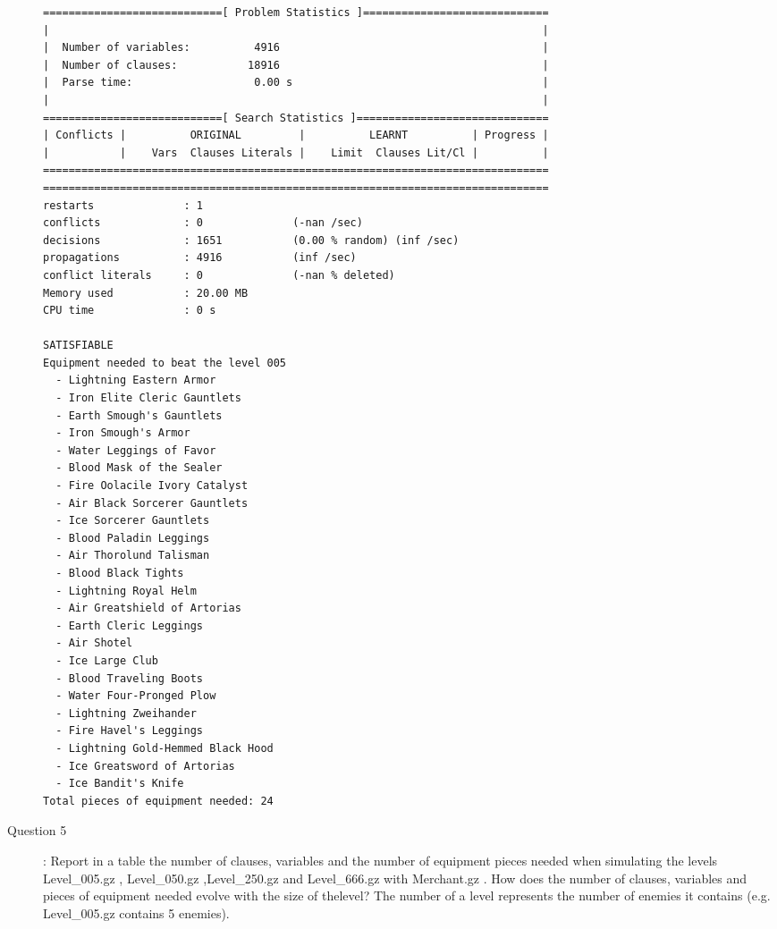 \begin{description}
\begin{verbatim}
============================[ Problem Statistics ]=============================
|                                                                             |
|  Number of variables:          4916                                         |
|  Number of clauses:           18916                                         |
|  Parse time:                   0.00 s                                       |
|                                                                             |
============================[ Search Statistics ]==============================
| Conflicts |          ORIGINAL         |          LEARNT          | Progress |
|           |    Vars  Clauses Literals |    Limit  Clauses Lit/Cl |          |
===============================================================================
===============================================================================
restarts              : 1
conflicts             : 0              (-nan /sec)
decisions             : 1651           (0.00 % random) (inf /sec)
propagations          : 4916           (inf /sec)
conflict literals     : 0              (-nan % deleted)
Memory used           : 20.00 MB
CPU time              : 0 s

SATISFIABLE
Equipment needed to beat the level 005
  - Lightning Eastern Armor
  - Iron Elite Cleric Gauntlets
  - Earth Smough's Gauntlets
  - Iron Smough's Armor
  - Water Leggings of Favor
  - Blood Mask of the Sealer
  - Fire Oolacile Ivory Catalyst
  - Air Black Sorcerer Gauntlets
  - Ice Sorcerer Gauntlets
  - Blood Paladin Leggings
  - Air Thorolund Talisman
  - Blood Black Tights
  - Lightning Royal Helm
  - Air Greatshield of Artorias
  - Earth Cleric Leggings
  - Air Shotel
  - Ice Large Club
  - Blood Traveling Boots
  - Water Four-Pronged Plow
  - Lightning Zweihander
  - Fire Havel's Leggings
  - Lightning Gold-Hemmed Black Hood
  - Ice Greatsword of Artorias
  - Ice Bandit's Knife
Total pieces of equipment needed: 24

\end{verbatim}
 
\item[Question 5]: Report in a table the number of clauses, variables and the number of equipment pieces needed when simulating the levels Level\_005.gz , Level\_050.gz ,Level\_250.gz and Level\_666.gz with Merchant.gz . How does the number of clauses, variables and pieces of equipment needed evolve with the size of thelevel? The number of a level represents the number of enemies it contains (e.g. Level\_005.gz contains 5 enemies).\\


\end{description}
